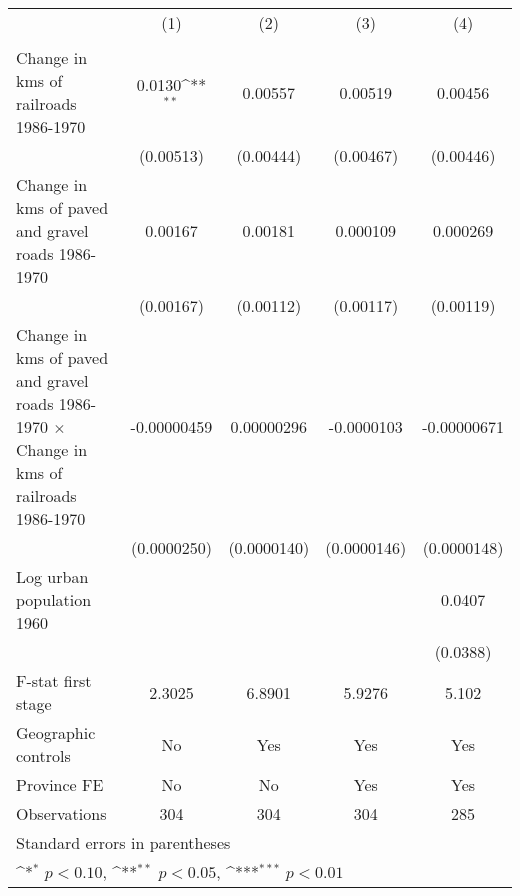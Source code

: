 {
\def\sym#1{\ifmmode^{#1}\else\(^{#1}\)\fi}
\begin{tabular}{l*{4}{c}}
\hline\hline
                &\multicolumn{1}{c}{(1)}&\multicolumn{1}{c}{(2)}&\multicolumn{1}{c}{(3)}&\multicolumn{1}{c}{(4)}\\
                &\multicolumn{1}{c}{}&\multicolumn{1}{c}{}&\multicolumn{1}{c}{}&\multicolumn{1}{c}{}\\
\hline
Change in kms of railroads 1986-1970&   0.0130\sym{**} &  0.00557         &  0.00519         &  0.00456         \\
                &(0.00513)         &(0.00444)         &(0.00467)         &(0.00446)         \\
[1em]
Change in kms of paved and gravel roads 1986-1970&  0.00167         &  0.00181         & 0.000109         & 0.000269         \\
                &(0.00167)         &(0.00112)         &(0.00117)         &(0.00119)         \\
[1em]
Change in kms of paved and gravel roads 1986-1970 $\times$ Change in kms of railroads 1986-1970&-0.00000459         &0.00000296         &-0.0000103         &-0.00000671         \\
                &(0.0000250)         &(0.0000140)         &(0.0000146)         &(0.0000148)         \\
[1em]
Log urban population 1960&                  &                  &                  &   0.0407         \\
                &                  &                  &                  & (0.0388)         \\
\hline
F-stat first stage&   2.3025         &   6.8901         &   5.9276         &    5.102         \\
Geographic controls&       No         &      Yes         &      Yes         &      Yes         \\
Province FE     &       No         &       No         &      Yes         &      Yes         \\
Observations    &      304         &      304         &      304         &      285         \\
\hline\hline
\multicolumn{5}{l}{\footnotesize Standard errors in parentheses}\\
\multicolumn{5}{l}{\footnotesize \sym{*} \(p<0.10\), \sym{**} \(p<0.05\), \sym{***} \(p<0.01\)}\\
\end{tabular}
}
